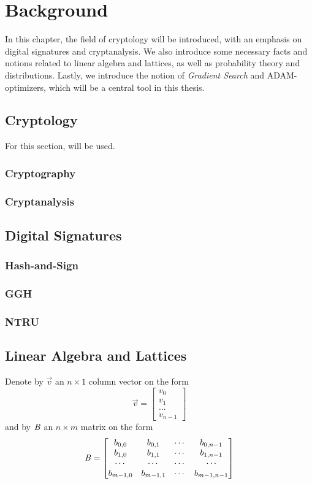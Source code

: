 \chapter{Background}
In this chapter, the field of cryptology will be introduced, with an emphasis on digital signatures and cryptanalysis.  
We also introduce some necessary facts and notions related to linear algebra and lattices, as well as probability theory and distributions.
Lastly, we introduce the notion of \textit{Gradient Search} and ADAM-optimizers, which will be a central tool in this thesis.

\section{Cryptology}
For this section, \cite{KL20} will be used.
\subsection{Cryptography}
\subsection{Cryptanalysis}

\section{Digital Signatures}
\subsection{Hash-and-Sign}
\subsection{GGH}
\subsection{NTRU}

\section{Linear Algebra and Lattices}
Denote by $\vec{v}$ an $n \times 1$ column vector on the form 
\[ \vec{v} = \begin{bmatrix} v_0 \\ v_1 \\ ... \\ v_{n-1} \end{bmatrix}\] and by $\mathit{B}$ an $n \times m$ matrix on the form 
\[
    \mathit{B} = 
    \begin{bmatrix}
        b_{0,0} & b_{0,1} & \cdots & b_{0, n-1} \\ 
        b_{1,0} & b_{1,1} & \cdots & b_{1, n-1} \\ 
        \cdots & \cdots & \cdots & \cdots\\
        b_{m-1,0} & b_{m-1,1} & \cdots & b_{m-1, n-1} \\ 
    \end{bmatrix}
\]

